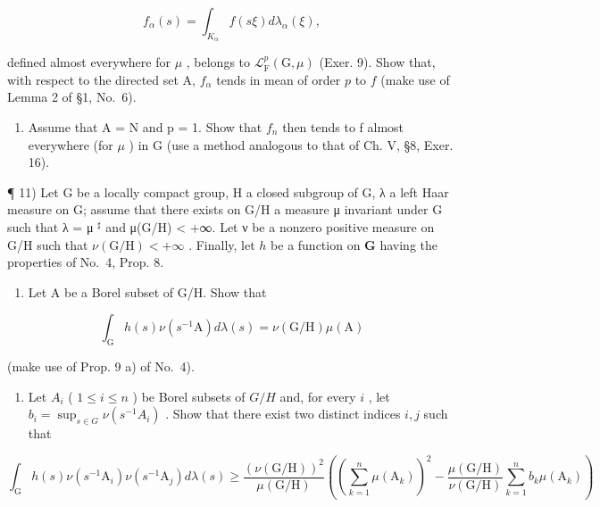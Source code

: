 \[
f _ {\alpha} (s) = \int_ {K _ {\alpha}} f (s \xi) d \lambda_ {\alpha} (\xi),
\]

defined almost everywhere for \(\mu\) , belongs to \(\mathcal{L}_{\mathrm{F}}^{p}(\mathrm{G},\mu)\) (Exer. 9). Show that, with respect to the directed set A, \(f_{\alpha}\) tends in mean of order \(p\) to \(f\) (make use of Lemma 2 of §1, No.~6).

\begin{enumerate}
\def\labelenumi{\alph{enumi})}
\setcounter{enumi}{1}
\tightlist
\item
  Assume that A = N and p = 1. Show that \(f_{n}\) then tends to f almost everywhere (for \(\mu\) ) in G (use a method analogous to that of Ch. V, §8, Exer. 16).
\end{enumerate}

¶ 11) Let G be a locally compact group, H a closed subgroup of G, λ a left Haar measure on G; assume that there exists on G/H a measure μ invariant under G such that λ = μ \(^{\sharp}\) and μ(G/H) \textless{} +∞. Let ν be a nonzero positive measure on G/H such that \(\nu (\mathrm{G / H}) < +\infty\) . Finally, let \(h\) be a function on \(\mathbf{G}\) having the properties of No.~4, Prop. 8.

\begin{enumerate}
\def\labelenumi{\alph{enumi})}
\tightlist
\item
  Let A be a Borel subset of G/H. Show that
\end{enumerate}

\[
\int_ {\mathrm{G}} h (s) \nu (s ^ {- 1} \mathrm{A}) d \lambda (s) = \nu (\mathrm{G/H}) \mu (\mathrm{A})
\]

(make use of Prop. 9 a) of No.~4).

\begin{enumerate}
\def\labelenumi{\alph{enumi})}
\setcounter{enumi}{1}
\tightlist
\item
  Let \(A_i\) ( \(1 \leqslant i \leqslant n\) ) be Borel subsets of \(G / H\) and, for every \(i\) , let \(b_i = \sup_{s \in G} \nu(s^{-1} A_i)\) . Show that there exist two distinct indices \(i, j\) such that
\end{enumerate}

\[
\int_ {\mathrm{G}} h (s) \nu (s ^ {- 1} \mathrm{A} _ {i}) \nu (s ^ {- 1} \mathrm{A} _ {j}) d \lambda (s) \geqslant \frac {\left(\nu (\mathrm{G} / \mathrm{H})\right) ^ {2}}{\mu (\mathrm{G} / \mathrm{H})} \left(\left(\sum_ {k = 1} ^ {n} \mu (\mathrm{A} _ {k})\right) ^ {2} - \frac {\mu (\mathrm{G} / \mathrm{H})}{\nu (\mathrm{G} / \mathrm{H})} \sum_ {k = 1} ^ {n} b _ {k} \mu (\mathrm{A} _ {k})\right)
\]

